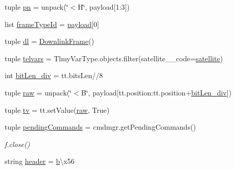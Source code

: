 \begin{DoxyCompactItemize}
\item 
tuple \hyperlink{namespace_tlmy_cmd_processor_1_1_tlmy_cmd_processor_a89663fb42c0b2e4e664217680921e07b}{pn} = unpack(\char`\"{}$<$H\char`\"{}, payload\mbox{[}1\+:3\mbox{]})
\item 
list \hyperlink{namespace_tlmy_cmd_processor_1_1_tlmy_cmd_processor_a128712f61580e83610264ccc8c908888}{frame\+Type\+Id} = \hyperlink{namespace_tlmy_cmd_processor_1_1_tlmy_cmd_processor_afad1fe5f56562d9cdfea8af4d7377065}{payload}\mbox{[}0\mbox{]}
\item 
tuple \hyperlink{namespace_tlmy_cmd_processor_1_1_tlmy_cmd_processor_a2703f38cf5bdc1ca5f19eeca336145ae}{dl} = \hyperlink{class_ground_segment_1_1models_1_1_downlink_frame_1_1_downlink_frame}{Downlink\+Frame}()
\item 
tuple \hyperlink{namespace_tlmy_cmd_processor_1_1_tlmy_cmd_processor_a9d8c45d2e203eaa7eb7be5ece0116d39}{telvars} = Tlmy\+Var\+Type.\+objects.\+filter(satellite\+\_\+\+\_\+code=\hyperlink{namespace_tlmy_cmd_processor_1_1_tlmy_cmd_processor_a5cf95a9cff868554c46d7a901df74673}{satellite})
\item 
int \hyperlink{namespace_tlmy_cmd_processor_1_1_tlmy_cmd_processor_a0edb15456685b1cc3f3d2820c0c48f70}{bit\+Len\+\_\+div} = tt.\+bits\+Len//8
\item 
tuple \hyperlink{namespace_tlmy_cmd_processor_1_1_tlmy_cmd_processor_ac2be67bdf9c4739fcb093941b2bc851a}{raw} = unpack(\char`\"{}$<$B\char`\"{}, payload\mbox{[}tt.\+position\+:tt.\+position+\hyperlink{namespace_tlmy_cmd_processor_1_1_tlmy_cmd_processor_a0edb15456685b1cc3f3d2820c0c48f70}{bit\+Len\+\_\+div}\mbox{]})
\item 
tuple \hyperlink{namespace_tlmy_cmd_processor_1_1_tlmy_cmd_processor_a36635165909c763c93ffdab98dd13ec3}{tv} = tt.\+set\+Value(\hyperlink{namespace_tlmy_cmd_processor_1_1_tlmy_cmd_processor_ac2be67bdf9c4739fcb093941b2bc851a}{raw}, True)
\item 
tuple \hyperlink{namespace_tlmy_cmd_processor_1_1_tlmy_cmd_processor_a1d93029bff9d6ab97db745a744688bbd}{pending\+Commands} = cmdmgr.\+get\+Pending\+Commands()
\begin{DoxyCompactList}\small\item\em f.\+close() \end{DoxyCompactList}\item 
string \hyperlink{namespace_tlmy_cmd_processor_1_1_tlmy_cmd_processor_aa59c73aaa44ae3a6862aa0c8678ae47b}{header} = \hyperlink{bootstrap_8min_8js_a398bb8542498d1b14178b02b99df309b}{b}\textquotesingle{}\textbackslash{}x56\textquotesingle{}

\end{DoxyCompactItemize}

